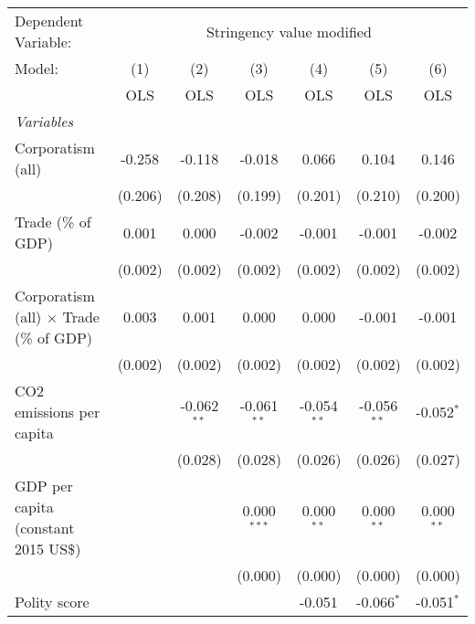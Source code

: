 
\begingroup
\centering
\begin{tabular}{lcccccc}
   \toprule
   Dependent Variable: & \multicolumn{6}{c}{Stringency value modified}\\
   Model:                                         & (1)     & (2)           & (3)           & (4)           & (5)           & (6)\\  
                                                  &  OLS    & OLS           & OLS           & OLS           & OLS           & OLS\\  
   \midrule
   \emph{Variables}\\
   Corporatism (all)                              & -0.258  & -0.118        & -0.018        & 0.066         & 0.104         & 0.146\\   
                                                  & (0.206) & (0.208)       & (0.199)       & (0.201)       & (0.210)       & (0.200)\\   
   Trade (\% of GDP)                              & 0.001   & 0.000         & -0.002        & -0.001        & -0.001        & -0.002\\   
                                                  & (0.002) & (0.002)       & (0.002)       & (0.002)       & (0.002)       & (0.002)\\   
   Corporatism (all) $\times$ Trade (\% of GDP)   & 0.003   & 0.001         & 0.000         & 0.000         & -0.001        & -0.001\\   
                                                  & (0.002) & (0.002)       & (0.002)       & (0.002)       & (0.002)       & (0.002)\\   
   CO2 emissions per capita                       &         & -0.062$^{**}$ & -0.061$^{**}$ & -0.054$^{**}$ & -0.056$^{**}$ & -0.052$^{*}$\\   
                                                  &         & (0.028)       & (0.028)       & (0.026)       & (0.026)       & (0.027)\\   
   GDP per capita (constant 2015 US\$)            &         &               & 0.000$^{***}$ & 0.000$^{**}$  & 0.000$^{**}$  & 0.000$^{**}$\\   
                                                  &         &               & (0.000)       & (0.000)       & (0.000)       & (0.000)\\   
   Polity score                                   &         &               &               & -0.051        & -0.066$^{*}$  & -0.051$^{*}$\\   

\end{tabular}
